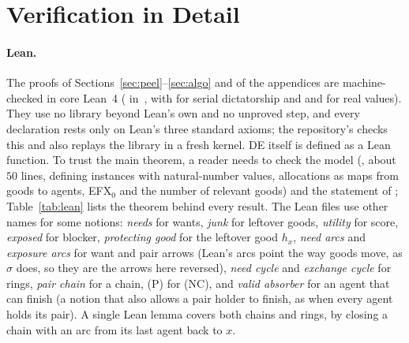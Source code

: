 \documentclass[runningheads,11pt]{llncs}
\newcommand{\efxz}{\texorpdfstring{\mbox{EFX$_0$}}{EFX0}}
\newcommand{\DE}{\textup{DE}}
\begin{document}
\section{Verification in Detail}\label{sec:evidence}

\paragraph{Lean.} The proofs of Sections~\ref{sec:peel}--\ref{sec:algo} and of the appendices are machine-checked in core Lean~4 ( in~\cite{Repo}, with  for serial dictatorship and  and  for real values). They use no library beyond Lean's own and no unproved step, and every declaration rests only on Lean's three standard axioms; the repository's  checks this and also replays the library in a fresh kernel. \DE{} itself is defined as a Lean function. To trust the main theorem, a reader needs to check the model (, about $50$ lines, defining instances with natural-number values, allocations as maps from goods to agents, \efxz{} and the number of relevant goods) and the statement of ; Table~\ref{tab:lean} lists the theorem behind every result. The Lean files use other names for some notions: \emph{needs} for wants, \emph{junk} for leftover goods, \emph{utility} for score, \emph{exposed} for blocker, \emph{protecting good} for the leftover good $h_x$, \emph{need arcs} and \emph{exposure arcs} for want and pair arrows (Lean's arcs point the way goods move, as $\sigma$ does, so they are the arrows here reversed), \emph{need cycle} and \emph{exchange cycle} for rings, \emph{pair chain} for a chain, (P) for (NC), and \emph{valid absorber} for an agent that can finish (a notion that also allows a pair holder to finish, as when every agent holds its pair). A single Lean lemma covers both chains and rings, by closing a chain with an arc from its last agent back to $x$.
\end{document}
